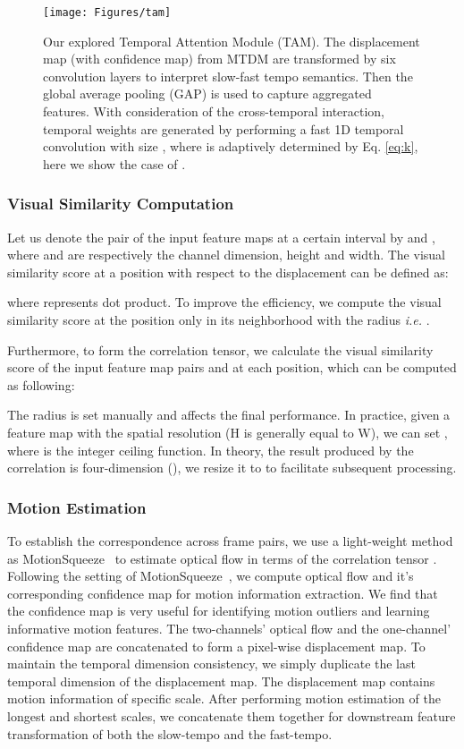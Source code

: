 \documentclass[journal]{IEEEtran}
\begin{document}
\begin{figure*}[tbp]
  \texttt{[image: Figures/tam]}
  \caption{Our explored Temporal Attention Module (TAM). The displacement map (with confidence map) from MTDM are transformed by six convolution layers to interpret slow-fast tempo semantics. Then the global average pooling (GAP) is used to capture aggregated features. With consideration of the cross-temporal interaction, temporal weights are generated by performing a fast 1D temporal convolution with size , where  is adaptively determined by Eq. \ref{eq:k}, here we show the case of .}
  \label{fig:tam}
\end{figure*}


\subsubsection{Visual Similarity Computation}
Let us denote the pair of the input feature maps at a certain interval  by  and , where  and  are respectively the channel dimension, height and width. The visual similarity score at a position  with respect to the displacement  can be defined as:

where  represents dot product. To improve the efficiency, we compute the visual similarity score at the position  only in its neighborhood with the radius  \textit{i.e.} .

Furthermore, to form the correlation tensor, we calculate the visual similarity score of the input feature map pairs  and  at each position, which can be computed as following:

The radius  is set manually and affects the final performance. In practice, given a feature map with the spatial resolution  (H is generally equal to W), we can set , where  is the integer ceiling function. In theory, the result produced by the correlation is four-dimension (), we resize it to  to facilitate subsequent processing.


\subsubsection{Motion Estimation}
To establish the correspondence across frame pairs, we use a light-weight method as MotionSqueeze~\cite{kwon2020motionsqueeze} to estimate optical flow in terms of the correlation tensor . Following the setting of MotionSqueeze~\cite{kwon2020motionsqueeze}, we compute optical flow and it's corresponding confidence map for motion information extraction. We find that the confidence map is very useful for identifying motion outliers and learning informative motion features.
The two-channels' optical flow and the one-channel' confidence map are concatenated to form a pixel-wise displacement map. To maintain the temporal dimension consistency, we simply duplicate the last temporal dimension of the displacement map. The displacement map contains motion information of specific scale. After performing motion estimation of the longest and shortest scales, we concatenate them together for downstream feature transformation of both the slow-tempo and the fast-tempo.
\end{document}

